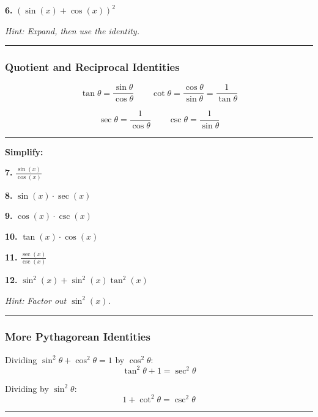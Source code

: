 \documentclass[
  11pt,
]{article}
\begin{document}
\textbf{6.} \((\sin(x) + \cos(x))^2\)

\emph{Hint: Expand, then use the identity.}

\begin{center}\rule{0.5\linewidth}{0.5pt}\end{center}

\hypertarget{quotient-and-reciprocal-identities}{%
\subsubsection{Quotient and Reciprocal
Identities}\label{quotient-and-reciprocal-identities}}

\[\tan\theta = \frac{\sin\theta}{\cos\theta} \qquad \cot\theta = \frac{\cos\theta}{\sin\theta} = \frac{1}{\tan\theta}\]

\[\sec\theta = \frac{1}{\cos\theta} \qquad \csc\theta = \frac{1}{\sin\theta}\]

\begin{center}\rule{0.5\linewidth}{0.5pt}\end{center}

\textbf{Simplify:}

\textbf{7.} \(\frac{\sin(x)}{\cos(x)}\)

\textbf{8.} \(\sin(x) \cdot \sec(x)\)

\textbf{9.} \(\cos(x) \cdot \csc(x)\)

\textbf{10.} \(\tan(x) \cdot \cos(x)\)

\textbf{11.} \(\frac{\sec(x)}{\csc(x)}\)

\textbf{12.} \(\sin^2(x) + \sin^2(x)\tan^2(x)\)

\emph{Hint: Factor out \(\sin^2(x)\).}

\begin{center}\rule{0.5\linewidth}{0.5pt}\end{center}

\hypertarget{more-pythagorean-identities}{%
\subsubsection{More Pythagorean
Identities}\label{more-pythagorean-identities}}

Dividing \(\sin^2\theta + \cos^2\theta = 1\) by \(\cos^2\theta\):
\[\boxed{\tan^2\theta + 1 = \sec^2\theta}\]

Dividing by \(\sin^2\theta\):
\[\boxed{1 + \cot^2\theta = \csc^2\theta}\]

\begin{center}\rule{0.5\linewidth}{0.5pt}\end{center}
\end{document}
